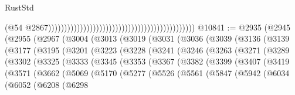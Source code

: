 \begin{lexlean}{RustStd}
\begin{coremodule}
{\begin{coremodule}
{{{{{{{{{{{{{{{{{{{{{{{{{{{{{{{{{{{{{{{{{{{{{{{{{{{{{{{{{{{{{{{{{{{{{{{{{{{{{{{{{{{{{                                                                                              (@54
                                                                                                @2867))))))))))))))))))))))))))))))))))))))))))))))
@10841 := @2935
    (@2945
      (@2955
        (@2967
          (@3004
            (@3013
              (@3019
                (@3031
                  (@3036
                    (@3039
                      (@3136
                        (@3139
                          (@3177
                            (@3195
                              (@3201
                                (@3223
                                  (@3228
                                    (@3241
                                      (@3246
                                        (@3263
                                          (@3271
                                            (@3289
                                              (@3302
                                                (@3325
                                                  (@3333
                                                    (@3345
                                                      (@3353
                                                        (@3367
                                                          (@3382
                                                            (@3399
                                                              (@3407
                                                                (@3419
                                                                  (@3571
                                                                    (@3662
                                                                      (@5069
                                                                        (@5170
                                                                          (@5277
                                                                            (@5526
                                                                              (@5561
                                                                                (@5847
                                                                                  (@5942
                                                                                    (@6034
                                                                                      (@6052
                                                                                        (@6208
                                                                                          (@6298
}}}}}}}}}}}}}}}}}}}}}}}}}}}}}}}}}}}}}}}}}}}}}}}}}}}}}}}}}}}}}}}}}}}}}}}}}}}}}}}}}}}}}
\end{coremodule}}
\end{coremodule}
\end{lexlean}
